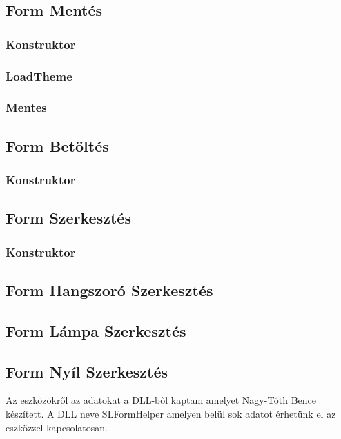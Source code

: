 \documentclass[tocnopagenum]{thesis-ekf}
\theoremstyle{definition}
\theoremstyle{remark}
\begin{document}
	\subsection{Form Mentés}
	\label{Form Mentes}
	\subsubsection{Konstruktor}
	\subsubsection{LoadTheme}
	\subsubsection{Mentes}
	\subsection{Form Betöltés}
	\label{Form Betoltes}
	\subsubsection{Konstruktor}
	\subsection{Form Szerkesztés}
	\label{Form Szerkesztes}
	\subsubsection{Konstruktor}
	\subsection{Form Hangszoró Szerkesztés}
	\subsection{Form Lámpa Szerkesztés}
	\subsection{Form Nyíl Szerkesztés}

	Az eszközökről az adatokat a DLL-ből kaptam amelyet Nagy-Tóth Bence készített. A DLL neve SLFormHelper amelyen belül sok adatot érhetünk el az eszközzel kapcsolatosan. %
	
	

\end{document}
